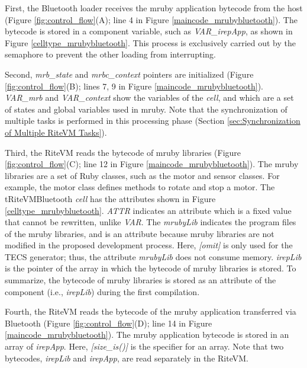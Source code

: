 \documentclass[conference]{IEEEtran/IEEEtran/IEEEtran}
\begin{document}
First, the Bluetooth loader receives the mruby application bytecode from the host (Figure \ref{fig:control_flow}(A); line 4 in Figure \ref{maincode_mrubybluetooth}).
The bytecode is stored in a component variable, such as {\it VAR\_irepApp}, as shown in Figure \ref{celltype_mrubybluetooth}.
This process is exclusively carried out by the semaphore to prevent the other loading from interrupting.

Second, {\it mrb\_state} and {\it mrbc\_context} pointers are initialized (Figure \ref{fig:control_flow}(B); lines 7, 9 in Figure \ref{maincode_mrubybluetooth}).
{\it VAR\_mrb} and {\it VAR\_context} show the variables of the {\it cell}, and which are a set of states and global variables used in mruby.
Note that the synchronization of multiple tasks is performed in this processing phase (Section \ref{sec:Synchronization of Multiple RiteVM Tasks}).

Third, the RiteVM reads the bytecode of mruby libraries (Figure \ref{fig:control_flow}(C); line 12 in Figure \ref{maincode_mrubybluetooth}).
The mruby libraries are a set of Ruby classes, such as the motor and sensor classes.
For example, the motor class defines methods to rotate and stop a motor.
The tRiteVMBluetooth {\it cell} has the attributes shown in Figure \ref{celltype_mrubybluetooth}.
{\it ATTR} indicates an attribute which is a fixed value that cannot be rewritten, unlike {\it VAR}.
The {\it mrubyLib} indicates the program files of the mruby libraries, and is an attribute because mruby libraries are not modified in the proposed development process.
Here, {\it [omit]} is only used for the TECS generator; thus, the attribute {\it mrubyLib} does not consume memory.
{\it irepLib} is the pointer of the array in which the bytecode of mruby libraries is stored.
To summarize, the bytecode of mruby libraries is stored as an attribute of the component (i.e., {\it irepLib}) during the first compilation.

Fourth, the RiteVM reads the bytecode of the mruby application transferred via Bluetooth (Figure \ref{fig:control_flow}(D); line 14 in Figure \ref{maincode_mrubybluetooth}).
The mruby application bytecode is stored in an array of {\it irepApp}.
Here, {\it [size\_is()]} is the specifier for an array.
Note that two bytecodes, {\it irepLib} and {\it irepApp}, are read separately in the RiteVM.
\end{document}

